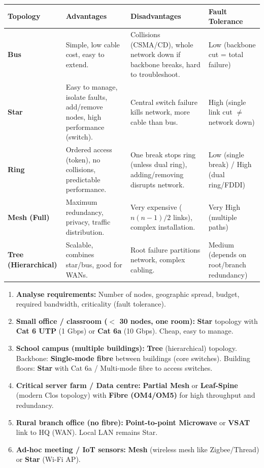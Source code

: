 \documentclass[11pt]{article}
\begin{document}
\begin{center}
\begin{tabularx}{\linewidth}{|l|X|X|X|}
\hline
\rowcolor{popblueL}
\textbf{Topology} & \textbf{Advantages} & \textbf{Disadvantages} & \textbf{Fault Tolerance} \\
\hline
\textbf{Bus} & Simple, low cable cost, easy to extend. & Collisions (CSMA/CD), whole network down if backbone breaks, hard to troubleshoot. & Low (backbone cut = total failure) \\
\hline
\textbf{Star} & Easy to manage, isolate faults, add/remove nodes, high performance (switch). & Central switch failure kills network, more cable than bus. & High (single link cut $\ne$ network down) \\
\hline
\textbf{Ring} & Ordered access (token), no collisions, predictable performance. & One break stops ring (unless dual ring), adding/removing disrupts network. & Low (single break) / High (dual ring/FDDI) \\
\hline
\textbf{Mesh (Full)} & Maximum redundancy, privacy, traffic distribution. & Very expensive ($n(n-1)/2$ links), complex installation. & Very High (multiple paths) \\
\hline
\textbf{Tree (Hierarchical)} & Scalable, combines star/bus, good for WANs. & Root failure partitions network, complex cabling. & Medium (depends on root/branch redundancy) \\
\hline
\end{tabularx}
\end{center}

\begin{methode}
\begin{enumerate}
    \item \textbf{Analyse requirements:} Number of nodes, geographic spread, budget, required bandwidth, criticality (fault tolerance).
    \item \textbf{Small office / classroom ($<$ 30 nodes, one room):} \textbf{Star} topology with \textbf{Cat 6 UTP} (1 Gbps) or \textbf{Cat 6a} (10 Gbps). Cheap, easy to manage.
    \item \textbf{School campus (multiple buildings):} \textbf{Tree} (hierarchical) topology. Backbone: \textbf{Single-mode fibre} between buildings (core switches). Building floors: \textbf{Star} with Cat 6a / Multi-mode fibre to access switches.
    \item \textbf{Critical server farm / Data centre:} \textbf{Partial Mesh} or \textbf{Leaf-Spine} (modern Clos topology) with \textbf{Fibre (OM4/OM5)} for high throughput and redundancy.
    \item \textbf{Rural branch office (no fibre):} \textbf{Point-to-point Microwave} or \textbf{VSAT} link to HQ (WAN). Local LAN remains Star.
    \item \textbf{Ad-hoc meeting / IoT sensors:} \textbf{Mesh} (wireless mesh like Zigbee/Thread) or \textbf{Star} (Wi-Fi AP).
\end{enumerate}
\end{methode}
\end{document}
